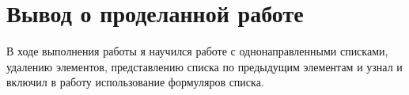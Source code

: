 \documentclass[12pt,a4paper]{extarticle}
\begin{document}
\section{Вывод о проделанной работе}
В ходе выполнения работы я научился работе с однонаправленными списками, удалению элементов, представлению
списка по предыдущим элементам и узнал и включил в работу использование формуляров списка.
\end{document}

